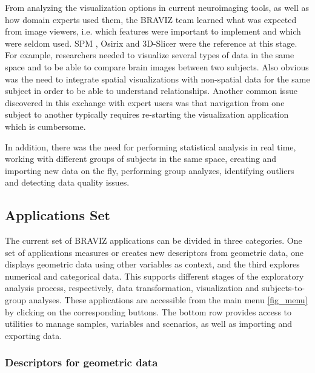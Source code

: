 \documentclass{frontiersHLTH}
\begin{document}
From analyzing the visualization options in current neuroimaging tools, as well as how domain experts used them, the BRAVIZ team learned what was expected from image viewers, i.e. which features were important to implement and which were seldom used. SPM \cite{friston_statistical_2007}, Osirix \cite{rosset_osirix:_2004} and 3D-Slicer \cite{fedorov_3d_2012} were the reference at this stage. For example, researchers needed to visualize several types of data in the same space and to be able to compare brain images between two subjects. Also obvious was the need to integrate spatial visualizations with non-spatial data for the same subject in order to be able to understand relationships. Another common issue discovered in this exchange with expert users was that navigation from one subject to another typically requires re-starting the visualization application which is cumbersome. 

In addition, there was the need for performing statistical analysis in real time, working with different groups of subjects in the same space, creating and importing new data on the fly, performing group analyzes, identifying outliers and detecting data quality issues. 


\subsection{Applications Set}
\label{braviz_apps}

The current set of BRAVIZ applications can be divided in three categories. One set of applications measures or creates new descriptors from geometric data, one displays geometric data using other variables as context, and the third explores numerical and categorical data. This supports different stages of the exploratory analysis process, respectively, data transformation, visualization and subjects-to-group analyses. These applications are accessible from the main menu \ref{fig_menu} by clicking on the corresponding buttons. The bottom row provides access to utilities to manage samples, variables and scenarios, as well as importing and exporting data. 

\subsubsection{Descriptors for geometric data}
\end{document}
